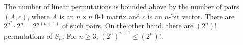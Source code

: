 The number of linear permutations is bounded above by the number of pairs $(A,c)$, where $A$ is an $n\times n$ 0-1 matrix and $c$ is an $n$-bit vector.
There are $2^{n^2}\!\!\cdot2^n=2^{n(n+1)}$ of such pairs.
On the other hand, there are $(2^n)!$ permutations of $S_n$.
For $n\ge3$, $(2^n)^{n+1}\le(2^n)!$.
